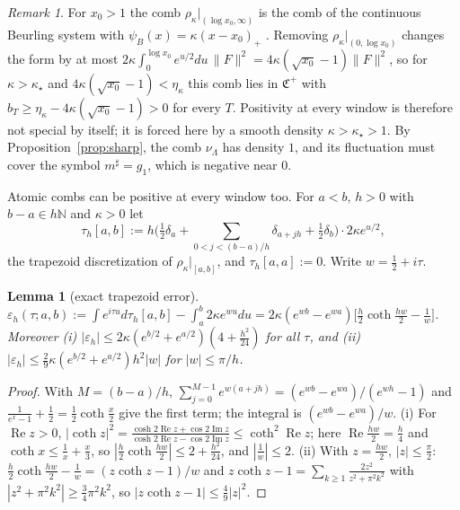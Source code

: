 \documentclass[11pt]{amsart}
\newtheorem{lemma}[theorem]{Lemma}
\theoremstyle{definition}
\theoremstyle{remark}
\newtheorem{remark}[theorem]{Remark}
\newcommand{\N}{\mathbb N}
\newcommand{\Rel}{\operatorname{Re}}
\newcommand{\Iml}{\operatorname{Im}}
\begin{document}
\begin{remark}\label{rem:beurling}
For $x_0>1$ the comb $\rho_\kappa|_{(\log x_0,\infty)}$ is the comb of the continuous Beurling system with
$\psi_B(x)=\kappa(x-x_0)_+$ \cite{DiamondZhang2016}. Removing $\rho_\kappa|_{(0,\log x_0)}$ changes the form by at most
$2\kappa\int_0^{\log x_0}e^{u/2}du\,\|F\|^2=4\kappa(\sqrt{x_0}-1)\|F\|^2$, so for $\kappa>\kappa_\star$ and $4\kappa(\sqrt{x_0}-1)<\eta_\kappa$
this comb lies in $\mathfrak C^+$ with $b_T\ge\eta_\kappa-4\kappa(\sqrt{x_0}-1)>0$ for every $T$. Positivity at every window is
therefore not special by itself; it is forced here by a smooth density $\kappa>\kappa_\star>1$. By
Proposition~\ref{prop:sharp}, the comb $\nu_\Lambda$ has density $1$, and its fluctuation must cover the symbol
$m^\sharp=g_1$, which is negative near $0$.
\end{remark}

Atomic combs can be positive at every window too. For $a<b$, $h>0$ with $b-a\in h\N$ and $\kappa>0$ let
\[
\tau_h[a,b]:=h\Big(\tfrac12\delta_a+\sum_{0<j<(b-a)/h}\delta_{a+jh}+\tfrac12\delta_b\Big)\cdot2\kappa e^{u/2},
\]
the trapezoid discretization of $\rho_\kappa|_{[a,b]}$, and $\tau_h[a,a]:=0$. Write $w=\frac12+i\tau$.

\begin{lemma}[exact trapezoid error]\label{lem:trap}
$\varepsilon_h(\tau;a,b):=\int e^{i\tau u}d\tau_h[a,b]-\int_a^b2\kappa e^{wu}du=2\kappa(e^{wb}-e^{wa})\big[\frac h2\coth\frac{hw}2-\frac1w\big]$. Moreover
\emph{(i)} $|\varepsilon_h|\le2\kappa(e^{b/2}+e^{a/2})(4+\frac{h^2}{24})$ for all $\tau$, and
\emph{(ii)} $|\varepsilon_h|\le\frac29\kappa(e^{b/2}+e^{a/2})h^2|w|$ for $|w|\le\pi/h$.
\end{lemma}

\begin{proof}
With $M=(b-a)/h$, $\sum_{j=0}^{M-1}e^{w(a+jh)}=(e^{wb}-e^{wa})/(e^{wh}-1)$ and $\frac1{e^x-1}+\frac12=\frac12\coth\frac x2$ give the
first term; the integral is $(e^{wb}-e^{wa})/w$. (i) For $\Rel z>0$, $|\coth z|^2=\frac{\cosh2\Rel z+\cos2\Iml z}{\cosh2\Rel z-\cos2\Iml z}\le\coth^2\Rel z$;
here $\Rel\frac{hw}2=\frac h4$ and $\coth x\le\frac1x+\frac x3$, so $|\frac h2\coth\frac{hw}2|\le2+\frac{h^2}{24}$, and $|\frac1w|\le2$.
(ii) With $z=\frac{hw}2$, $|z|\le\frac\pi2$: $\frac h2\coth\frac{hw}2-\frac1w=(z\coth z-1)/w$ and
$z\coth z-1=\sum_{k\ge1}\frac{2z^2}{z^2+\pi^2k^2}$ with $|z^2+\pi^2k^2|\ge\frac34\pi^2k^2$, so $|z\coth z-1|\le\frac49|z|^2$.
\end{proof}
\end{document}
